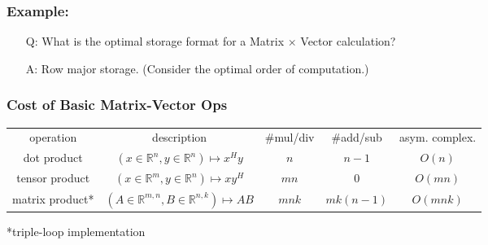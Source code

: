 \documentclass[12pt,a4paper]{article}
\begin{document}
\subsubsection{Example:}
\begin{itemize}
\item[Q:] What is the optimal storage format for a Matrix $\times$ Vector calculation?
\item[A:] Row major storage. (Consider the optimal order of computation.)
\end{itemize}
\subsubsection{Cost of Basic Matrix-Vector Ops}
\begin{tabularx}{\linewidth}{c c c c c}
operation & description & \#mul/div & \#add/sub & asym. complex.\\
dot product & $(x \in \mathbb{R}^n, y \in \mathbb{R}^n) \mapsto x^Hy$ & $n$ & $n-1$ & $O(n)$\\
tensor product & $(x \in \mathbb{R}^m, y \in \mathbb{R}^n) \mapsto xy^H$ & $mn$ & $0$ & $O(mn)$\\
matrix product* & $(A \in \mathbb{R}^{m,n}, B \in \mathbb{R}^{n,k}) \mapsto AB$ & $mnk$ & $mk(n-1)$ & $O(mnk)$
\end{tabularx}
*triple-loop implementation
\end{document}
